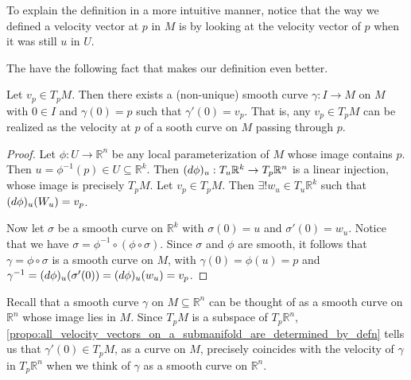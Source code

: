 \documentclass[notoc,notitlepage]{tufte-book}
\begin{document}
\begin{remark}
  To explain the definition in a more intuitive manner, notice that the way we
  defined a velocity vector at $p$ in $M$ is by looking at the velocity vector
  of $p$ when it was still $u$ in $U$.
\end{remark}

The have the following fact that makes our definition even better.

\begin{propo}\label{propo:all_velocity_vectors_on_a_submanifold_are_determined_by_defn}
  Let $v_p \in T_p M$. Then there exists a (non-unique) smooth curve $\gamma : I
  \to M$ on $M$ with $0 \in I$ and $\gamma(0) = p$ such that $\gamma'(0) = v_p$.
  That is, any $v_p \in T_p M$ can be realized as the velocity at $p$ of a sooth
  curve on $M$ passing through $p$.
\end{propo}

\begin{proof}
  Let $\phi: U \to \mathbb{R}^n$ be any local parameterization of $M$ whose image
  contains $p$. Then $u = \phi^{-1}(p) \in U \subseteq \mathbb{R}^k$. Then
  $(\mathop{}\!d{\phi})_u : T_u \mathbb{R}^k \to T_p \mathbb{R}^n$ is a linear
  injection, whose image is precisely $T_p M$. Let $v_p \in T_p M$. Then
  $\exists! w_u \in T_u \mathbb{R}^k$ such that $(\mathop{}\!d{\phi})_u (W_u) = v_p$.

  Now let $\sigma$ be a smooth curve on $\mathbb{R}^k$ with $\sigma(0) = u$ and
  $\sigma'(0) = w_u$. Notice that we have $\sigma = \phi^{-1} \circ ( \phi \circ
  \sigma)$. Since $\sigma$ and $\phi$ are smooth, it follows that $\gamma = \phi
  \circ \sigma$ is a smooth curve on $M$, with $\gamma(0) = \phi(u) = p$ and
  $\gamma^{-1} = (\mathop{}\!d{\phi})_u (\sigma'(0)) = (\mathop{}\!d{\phi})_u (w_u) = v_p$.
\end{proof}

\begin{note}
  Recall that a smooth curve $\gamma$ on $M \subseteq \mathbb{R}^n$ can be
  thought of as a smooth curve on $\mathbb{R}^n$ whose image lies in $M$. Since
  $T_p M$ is a subspace of $T_p \mathbb{R}^n$,
  \cref{propo:all_velocity_vectors_on_a_submanifold_are_determined_by_defn}
  tells us that $\gamma'(0) \in T_p M$, as a curve on $M$, precisely coincides
  with the velocity of $\gamma$ in $T_p \mathbb{R}^n$ when we think of $\gamma$
  as a smooth curve on $\mathbb{R}^n$.
\end{note}
\end{document}
